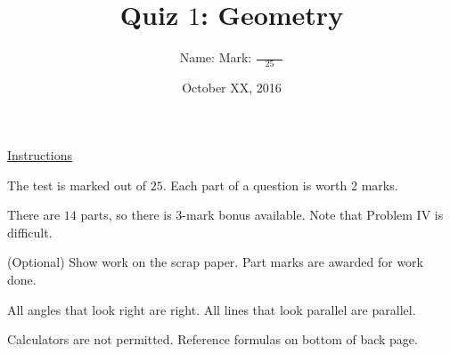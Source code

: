 \documentclass[12pt,letterpaper]{article}
\title{Quiz $1$: Geometry}
\author{Name: \underline{\hspace{5cm}} Mark: $\displaystyle \frac{\hspace{3em}}{25}$}
\date{October XX, 2016}
\begin{document}
\newcommand*\circleletter[1]{%
  \begin{tikzpicture}[baseline=(C.base)]
    \node[draw,circle,inner sep=1pt](C) {#1};
  \end{tikzpicture}}

\maketitle

\thispagestyle{empty}

\noindent\underline{Instructions}

\noindent The test is marked out of $25$. Each part of a question is worth $2$
marks.

\noindent There are $14$ parts, so there is $3$-mark bonus available. Note that
Problem IV is difficult.

\noindent (Optional) Show work on the scrap paper. Part marks are awarded for
work done.

\noindent All angles that look right are right. All lines that look parallel are
parallel.

\noindent Calculators are not permitted. Reference formulas on bottom of back
page.
\end{document}
